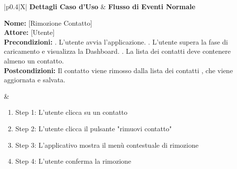 \documentclass[a4paper,12pt]{article}
\begin{document}
    \begin{table}[htbp]
        \centering
        \begin{tabularx}{\textwidth}{|p{0.4\textwidth}|X|}
            \hline
            \textbf{Dettagli Caso d'Uso} & \textbf{Flusso di Eventi Normale} \\
            \hline
            \parbox[t]{0.38\textwidth}{%
                \textbf{Nome:} [Rimozione Contatto] \\[1ex]
                \textbf{Attore:} [Utente] \\[1ex]
                \textbf{Precondizioni:} . L'utente avvia l'applicazione. . L'utente supera la fase di caricamento e visualizza la Dashboard. . La lista dei contatti deve contenere almeno un contatto. \newline \\[1ex]
                \textbf{Postcondizioni:} \newline Il contatto viene rimosso dalla lista dei contatti , che viene aggiornata e salvata.\newline
            }
            &
            \parbox[t]{\linewidth}{%
                \begin{enumerate}[noitemsep, leftmargin=*]
                    \item Step 1: L'utente clicca su un contatto
                    \item Step 2: L'utente clicca il pulsante "rimuovi contatto"
                    \item Step 3: L'applicativo mostra il menù contestuale di rimozione
                    \item Step 4: L'utente conferma la rimozione
                \end{enumerate}
            } \\
            \hline
             \\
            \hline
        \end{tabularx}
        \caption{Rimozione Contatto}
    \end{table}
    \newpage
\end{document}
